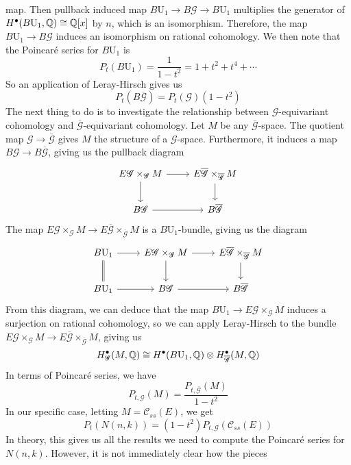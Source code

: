 map. Then pullback induced map $B \mathrm{U}_1 \to B\mathscr{G} \to B \mathrm{U}_1$
multiplies the generator of $H^\bullet(B \mathrm{U}_1, \mathbb{Q}) \cong \mathbb{Q}[x]$ by $n$,
which is an isomorphism. Therefore, the map $B \mathrm{U}_1 \to B\mathscr{G}$
induces an isomorphism on rational cohomology. We then note that the
Poincar\'e series for $B \mathrm{U}_1$ is
\[
P_t(B \mathrm{U}_1) = \frac{1}{1-t^2} = 1 + t^2 + t^4 + \cdots
\]
So an application of Leray-Hirsch gives us
\[
P_t(B\overline{\mathscr{G}}) = P_t(\mathscr{G})(1-t^2)
\]
The next thing to do is to investigate the relationship between
$\mathscr{G}$-equivariant cohomology and $\overline{\mathscr{G}}$-equivariant
cohomology. Let $M$ be any $\overline{\mathscr{G}}$-space. The quotient map
$\mathscr{G} \to \overline{\mathscr{G}}$ gives $M$ the structure of
a $\mathscr{G}$-space. Furthermore, it induces a map
$B\mathscr{G} \to B\overline{\mathscr{G}}$, giving us the pullback diagram
\[\begin{tikzcd}
E\mathscr{G} \times_{\mathscr{G}} M \ar[r] \ar[d] &
E\overline{\mathscr{G}} \times_{\overline{\mathscr{G}}} M \ar[d] \\
B\mathscr{G} \ar[r] & B\overline{\mathscr{G}}
\end{tikzcd}\]
The map $E\mathscr{G} \times_{\mathscr{G}} M
\to E\overline{\mathscr{G}} \times_{\overline{\mathscr{G}}} M$ is a
$B \mathrm{U}_1$-bundle, giving us the diagram
\[\begin{tikzcd}
B \mathrm{U}_1 \ar[r] \ar[d,equals]& E\mathscr{G} \times_{\mathscr{G}} M \ar[r] \ar[d] &
E\overline{\mathscr{G}} \times_{\overline{\mathscr{G}}} M \ar[d] \\
B \mathrm{U}_1 \ar[r] & B\mathscr{G} \ar[r] & B\overline{\mathscr{G}}
\end{tikzcd}\]
From this diagram, we can deduce that the map
$B \mathrm{U}_1 \to E\mathscr{G}\times_{\mathscr{G}} M$ induces a surjection
on rational cohomology, so we can apply Leray-Hirsch to the bundle
$E\mathscr{G} \times_{\mathscr{G}} M
\to E\overline{\mathscr{G}} \times_{\overline{\mathscr{G}}} M$,
giving us
\[
H^\bullet_{\mathscr{G}}(M,\mathbb{Q}) \cong
H^\bullet(B\mathrm{U}_1, \mathbb{Q}) \otimes H^\bullet_{\overline{\mathscr{G}}}(M,\mathbb{Q})
\]
In terms of Poincar\'e series, we have
\[
P_{t,\mathscr{G}}(M) = \frac{P_{t,\overline{\mathscr{G}}}(M)}{1-t^2}
\]
In our specific case, letting $M = \mathscr{C}_{ss}(E)$, we get
\[
P_t(N(n,k)) = (1-t^2)P_{t,\mathscr{G}}(\mathscr{C}_{ss}(E))
\]
In theory, this gives us all the results we need to compute the Poincar\'e
series for $N(n,k)$. However, it is not immediately clear how the pieces
